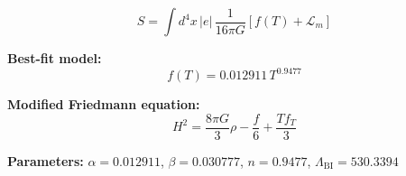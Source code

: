 
\begin{equation}
  S = \int d^4x \, |e| \, \frac{1}{16\pi G} \left[ f(T) + \mathcal{L}_m \right]
\end{equation}

\textbf{Best-fit model:}
\begin{equation}
  f(T) = 0.012911 \, T^{0.9477}
\end{equation}

\textbf{Modified Friedmann equation:}
\begin{equation}
  H^2 = \frac{8\pi G}{3} \rho - \frac{f}{6} + \frac{T f_T}{3}
\end{equation}

\textbf{Parameters:}
$\alpha = 0.012911$, \quad
$\beta = 0.030777$, \quad
$n = 0.9477$, \quad
$\Lambda_{\text{BI}} = 530.3394$